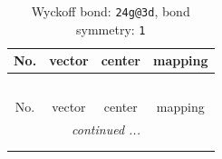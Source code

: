 \documentclass[fleqn,8pt]{jsarticle}
\begin{document}
\renewcommand{\arraystretch}{1.2}
\begin{longtable}{cccc}
\caption{Wyckoff bond: {\tt 24g@3d}, bond symmetry: {\tt 1}}
 \\
 \hline \hline
No. & vector & center & mapping \\ \hline \endfirsthead

\multicolumn{3}{l}{\tablename\ \thetable{}} \\
 \hline \hline
No. & vector & center & mapping \\ \hline \endhead

 \hline \hline
\multicolumn{3}{r}{\footnotesize\it continued ...} \\ \endfoot

 \hline \hline
\multicolumn{3}{r}{} \\ \endlastfoot


\end{longtable}
\end{document}
